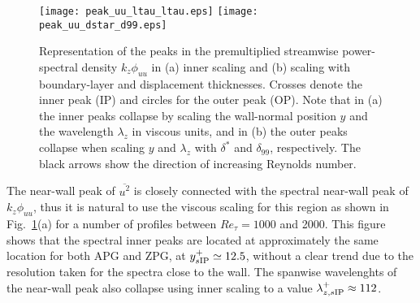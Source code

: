 
\begin{figure}
\texttt{[image: peak\_uu\_ltau\_ltau.eps]}
\texttt{[image: peak\_uu\_dstar\_d99.eps]}
\caption{ \label{fig:peaks} Representation of the peaks in the premultiplied streamwise power-spectral density $k_z\phi_{uu}$ in (a) inner scaling and (b) scaling with boundary-layer and displacement thicknesses. Crosses denote the inner peak (IP) and circles for the outer peak (OP). Note that in (a) the inner peaks collapse by scaling the wall-normal position $y$ and the wavelength $\lambda_z$ in viscous units, and in (b) the outer peaks collapse when scaling $y$ and $\lambda_z$ with $\delta^*$ and $\delta_{99}$, respectively. The black arrows show the direction of increasing Reynolds number.}
\end{figure}

The near-wall peak of $\overline{u^2}$ is closely connected with the spectral near-wall peak of $k_z\phi_{uu}$, thus it is natural to use the viscous scaling for this region as shown in Fig.~\ref{fig:peaks}(a) for a number of profiles between $Re_{\tau}=1000$ and 2000. This figure shows that the spectral inner peaks are located at approximately the same location for both APG and ZPG, at $y_{s \rm IP}^+\simeq 12.5$, without a clear trend due to the resolution taken for the spectra close to the wall.
The spanwise wavelenghts of the near-wall peak also collapse using inner scaling to a value $\lambda_{z,s \rm IP}^+ \approx 112$.

